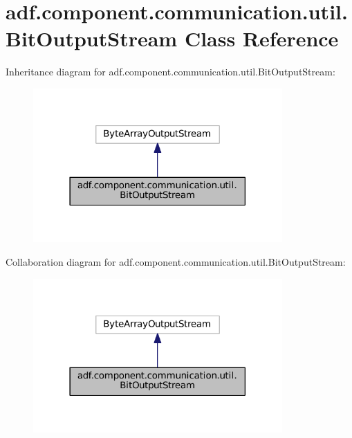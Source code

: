 \hypertarget{classadf_1_1component_1_1communication_1_1util_1_1BitOutputStream}{}\section{adf.\+component.\+communication.\+util.\+Bit\+Output\+Stream Class Reference}
\label{classadf_1_1component_1_1communication_1_1util_1_1BitOutputStream}


Inheritance diagram for adf.\+component.\+communication.\+util.\+Bit\+Output\+Stream\+:
\nopagebreak
\begin{figure}[H]
\begin{center}
\leavevmode
\includegraphics[width=270pt]{classadf_1_1component_1_1communication_1_1util_1_1BitOutputStream__inherit__graph}
\end{center}
\end{figure}


Collaboration diagram for adf.\+component.\+communication.\+util.\+Bit\+Output\+Stream\+:
\nopagebreak
\begin{figure}[H]
\begin{center}
\leavevmode
\includegraphics[width=270pt]{classadf_1_1component_1_1communication_1_1util_1_1BitOutputStream__coll__graph}
\end{center}
\end{figure}

